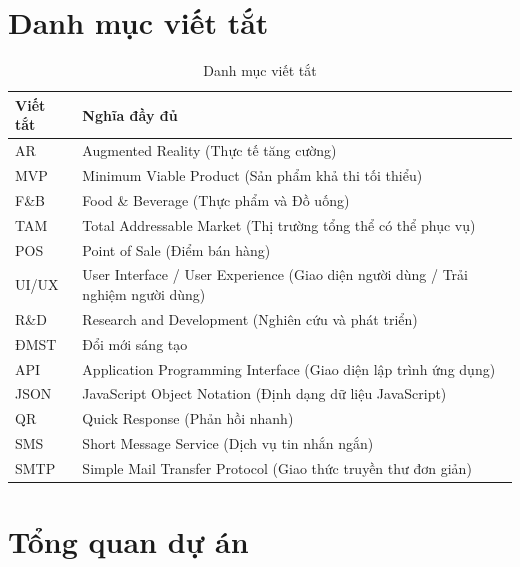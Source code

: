 \documentclass[12pt,a4paper]{article}
\begin{document}
\listoffigures
\newpage

\section*{Danh mục viết tắt} %

\begin{table}[H]
\centering
\caption{Danh mục viết tắt}
\label{tab:abbreviations}
\begin{tabular}{@{}p{3cm}@{\hspace{1cm}}p{10cm}@{}} %
    \toprule %
    \textbf{Viết tắt} & \textbf{Nghĩa đầy đủ} \\
    \midrule %
    AR & Augmented Reality (Thực tế tăng cường) \\
    MVP & Minimum Viable Product (Sản phẩm khả thi tối thiểu) \\
    F\&B & Food \& Beverage (Thực phẩm và Đồ uống) \\
    TAM & Total Addressable Market (Thị trường tổng thể có thể phục vụ) \\
    POS & Point of Sale (Điểm bán hàng) \\
    UI/UX & User Interface / User Experience (Giao diện người dùng / Trải nghiệm người dùng) \\
    R\&D & Research and Development (Nghiên cứu và phát triển) \\
    ĐMST & Đổi mới sáng tạo \\
    API & Application Programming Interface (Giao diện lập trình ứng dụng) \\
    JSON & JavaScript Object Notation (Định dạng dữ liệu JavaScript) \\
    QR & Quick Response (Phản hồi nhanh) \\
    SMS & Short Message Service (Dịch vụ tin nhắn ngắn) \\
    SMTP & Simple Mail Transfer Protocol (Giao thức truyền thư đơn giản) \\
    \bottomrule %
\end{tabular}
\end{table}

\newpage

\section{Tổng quan dự án}
\end{document}
